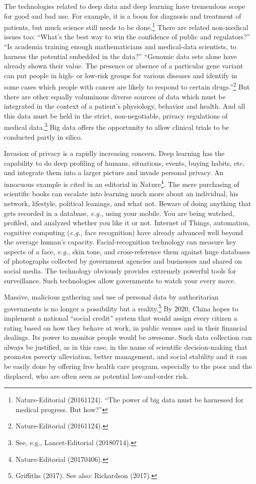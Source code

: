 \begin{multicols}{2}
The technologies related to deep data and deep learning have tremendous scope for good and bad use. For example, it is a boon for diagnosis and treatment of patients, but much science still needs to be done.\footnote{Nature-Editorial (20161124). “The power of big data must be harnessed for medical progress. But how?”}  There are related non-medical issues too: “What's the best way to win the confidence of public and regulators?” “Is academia training enough mathematicians and medical-data scientists, to harness the potential embedded in the data?” “Genomic data sets alone have already shown their value. The presence or absence of a particular gene variant can put people in high- or low-risk groups for various diseases and identify in some cases which people with cancer are likely to respond to certain drugs.”\footnote{Nature-Editorial (20161124).}  But there are other equally voluminous diverse sources of data which must be integrated in the context of a patient's physiology, behavior and health. And all this data must be held in the strict, non-negotiable, privacy regulations of medical data.\footnote{See, e.g., Lancet-Editorial (20180714).}  Big data offers the opportunity to allow clinical trials to be conducted partly in silico.

Invasion of privacy is a rapidly increasing concern. Deep learning has the capability to do deep profiling of humans, situations, events, buying habits, etc. and integrate them into a larger picture and invade personal privacy. An innocuous example is cited in an editorial in Nature\footnote{Nature-Editorial (20170406).}. The mere purchasing of scientific books can escalate into learning much more about an individual, his network, lifestyle, political leanings, and what not. Beware of doing anything that gets recorded in a database, \textit{e.g.,} using your mobile. You are being watched, profiled, and analyzed whether you like it or not. Internet of Things, automation, cognitive computing (\textit{e.g.,} face recognition) have already advanced well beyond the average human's capacity. Facial-recognition technology can measure key aspects of a face, \textit{e.g.,} skin tone, and cross-reference them against huge databases of photographs collected by government agencies and businesses and shared on social media. The technology obviously provides extremely powerful tools for surveillance. Such technologies allow governments to watch your every move.

Massive, malicious gathering and use of personal data by authoritarian governments is no longer a possibility but a reality.\footnote{Griffiths (2017). See also: Richardson (2017).}  By 2020, China hopes to implement a national “social credit” system that would assign every citizen a rating based on how they behave at work, in public venues and in their financial dealings. Its power to monitor people would be awesome. Such data collection can always be justified, as in this case, in the name of scientific decision-making that promotes poverty alleviation, better management, and social stability and it can be easily done by offering free health care program, especially to the poor and the displaced, who are often seen as potential law-and-order risk. 


\end{multicols}
